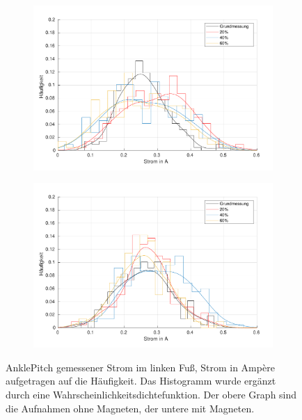 \begin{figure}[tb]
	\centering
		\begin{subfigure}[c]{.9\linewidth}
			\centering
			\includegraphics[width=\linewidth]{Bilder/links_Current_AnklePitch_ohneM.pdf}
		\end{subfigure}
		\begin{subfigure}[c]{.9\linewidth}
			\centering
			\includegraphics[width=\linewidth]{Bilder/links_Current_AnklePitch_mitM.pdf}
		\end{subfigure}
	\caption{AnklePitch gemessener Strom im linken Fuß, Strom in Ampère aufgetragen auf die Häufigkeit. Das Histogramm wurde ergänzt durch eine Wahrscheinlichkeitsdichtefunktion. Der obere Graph sind die Aufnahmen ohne Magneten, der untere mit Magneten.} \label{AnklePitch_Current_links}
\end{figure}
